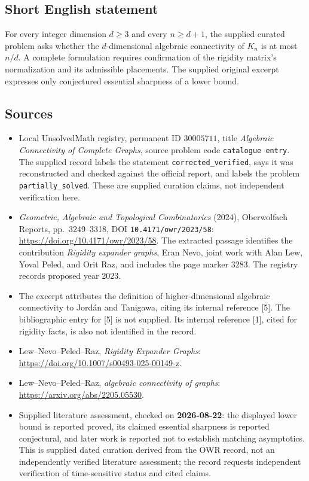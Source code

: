 \documentclass[11pt]{article}
\begin{document}
\subsection{Short English statement}
For every integer dimension \(d\geq3\) and every \(n\geq d+1\), the supplied curated problem asks whether the \(d\)-dimensional algebraic connectivity of \(K_n\) is at most \(n/d\). A complete formulation requires confirmation of the rigidity matrix's normalization and its admissible placements. The supplied original excerpt expresses only conjectured essential sharpness of a lower bound.
\subsection{Sources}
\begin{itemize}
\item Local UnsolvedMath registry, permanent ID \(30005711\), title \emph{Algebraic Connectivity of Complete Graphs}, source problem code \texttt{catalogue entry}. The supplied record labels the statement \texttt{corrected\_verified}, says it was reconstructed and checked against the official report, and labels the problem \texttt{partially\_solved}. These are supplied curation claims, not independent verification here.
\item \emph{Geometric, Algebraic and Topological Combinatorics} (2024), Oberwolfach Reports, pp.\ 3249--3318, DOI \texttt{10.4171/owr/2023/58}: \url{https://doi.org/10.4171/owr/2023/58}. The extracted passage identifies the contribution \emph{Rigidity expander graphs}, Eran Nevo, joint work with Alan Lew, Yoval Peled, and Orit Raz, and includes the page marker 3283. The registry records proposed year 2023.
\item The excerpt attributes the definition of higher-dimensional algebraic connectivity to Jord\'an and Tanigawa, citing its internal reference [5]. The bibliographic entry for [5] is not supplied. Its internal reference [1], cited for rigidity facts, is also not identified in the record.
\item Lew--Nevo--Peled--Raz, \emph{Rigidity Expander Graphs}: \url{https://doi.org/10.1007/s00493-025-00149-z}.
\item Lew--Nevo--Peled--Raz, \emph{algebraic connectivity of graphs}: \url{https://arxiv.org/abs/2205.05530}.
\item Supplied literature assessment, checked on \textbf{2026-08-22}: the displayed lower bound is reported proved, its claimed essential sharpness is reported conjectural, and later work is reported not to establish matching asymptotics. This is supplied dated curation derived from the OWR record, not an independently verified literature assessment; the record requests independent verification of time-sensitive status and cited claims.
\end{itemize}
\end{document}
